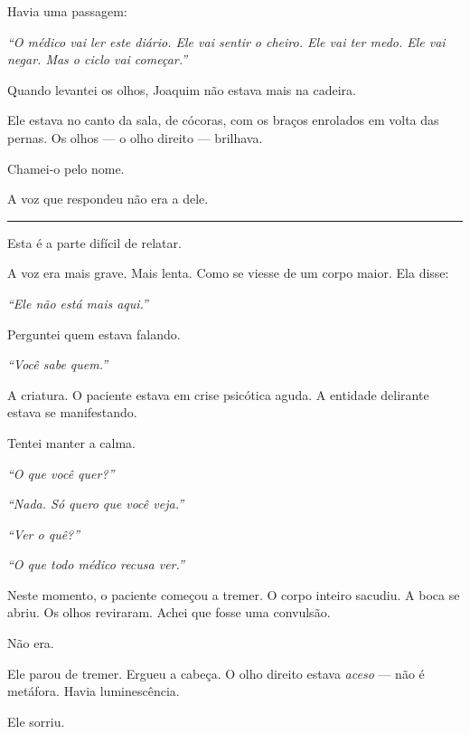 \noindent Havia uma passagem:

\noindent \textit{\textquotedblleft{}O médico vai ler este diário. Ele vai sentir o cheiro. Ele vai ter medo. Ele vai negar. Mas o ciclo vai começar.\textquotedblright{}}

\noindent Quando levantei os olhos, Joaquim não estava mais na cadeira.

\noindent Ele estava no canto da sala, de cócoras, com os braços enrolados em volta das pernas. Os olhos --- o olho direito --- brilhava.

\noindent Chamei-o pelo nome.

\noindent A voz que respondeu não era a dele.

\vspace{0.5em}\noindent\rule{\textwidth}{0.5pt}\vspace{0.5em}

\noindent Esta é a parte difícil de relatar.

\noindent A voz era mais grave. Mais lenta. Como se viesse de um corpo maior. Ela disse:

\noindent \textit{\textquotedblleft{}Ele não está mais aqui.\textquotedblright{}}

\noindent Perguntei quem estava falando.

\noindent \textit{\textquotedblleft{}Você sabe quem.\textquotedblright{}}

\noindent A criatura. O paciente estava em crise psicótica aguda. A entidade delirante estava se manifestando.

\noindent Tentei manter a calma.

\noindent \textit{\textquotedblleft{}O que você quer?\textquotedblright{}}

\noindent \textit{\textquotedblleft{}Nada. Só quero que você veja.\textquotedblright{}}

\noindent \textit{\textquotedblleft{}Ver o quê?\textquotedblright{}}

\noindent \textit{\textquotedblleft{}O que todo médico recusa ver.\textquotedblright{}}

\noindent Neste momento, o paciente começou a tremer. O corpo inteiro sacudiu. A boca se abriu. Os olhos reviraram. Achei que fosse uma convulsão.

\noindent Não era.

\noindent Ele parou de tremer. Ergueu a cabeça. O olho direito estava \textit{aceso} --- não é metáfora. Havia luminescência.

\noindent Ele sorriu.

